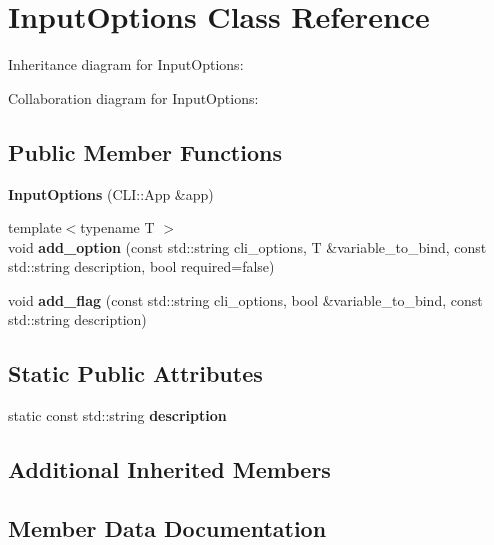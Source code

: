 \hypertarget{classInputOptions}{}\section{Input\+Options Class Reference}
\label{classInputOptions}


Inheritance diagram for Input\+Options\+:


Collaboration diagram for Input\+Options\+:
\subsection*{Public Member Functions}
\begin{DoxyCompactItemize}
\item 
{\bfseries Input\+Options} (C\+L\+I\+::\+App \&app)\hypertarget{classInputOptions_aa0da48b6508d4feb72d791281ec3b83d}{}\label{classInputOptions_aa0da48b6508d4feb72d791281ec3b83d}

\item 
{\footnotesize template$<$typename T $>$ }\\void {\bfseries add\+\_\+option} (const std\+::string cli\+\_\+options, T \&variable\+\_\+to\+\_\+bind, const std\+::string description, bool required=false)\hypertarget{classInputOptions_a0fe71bbd7d46ce5c66e1b50edf23b1dc}{}\label{classInputOptions_a0fe71bbd7d46ce5c66e1b50edf23b1dc}

\item 
void {\bfseries add\+\_\+flag} (const std\+::string cli\+\_\+options, bool \&variable\+\_\+to\+\_\+bind, const std\+::string description)\hypertarget{classInputOptions_a99a304a717c59b9f3ce222d820316883}{}\label{classInputOptions_a99a304a717c59b9f3ce222d820316883}

\end{DoxyCompactItemize}
\subsection*{Static Public Attributes}
\begin{DoxyCompactItemize}
\item 
static const std\+::string {\bfseries description}
\end{DoxyCompactItemize}
\subsection*{Additional Inherited Members}


\subsection{Member Data Documentation}
